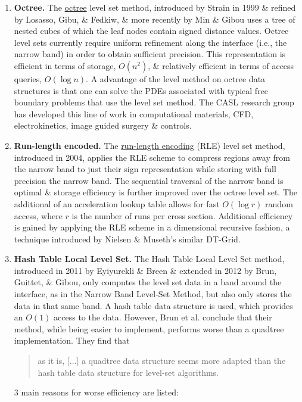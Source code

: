 \documentclass{article}
\begin{document}
\begin{enumerate}
	\item {\bf Octree.} The \href{https://en.wikipedia.org/wiki/Octree}{octree} level set method, introduced by {\sc Strain} in 1999 \& refined by {\sc Losasso, Gibu, \& Fedkiw}, \& more recently by {\sc Min \& Gibou} uses a tree of nested cubes of which the leaf nodes contain signed distance values. Octree level sets currently require uniform refinement along the interface (i.e., the narrow band) in order to obtain sufficient precision. This representation is efficient in terms of storage, $O(n^2)$, \& relatively efficient in terms of access queries, $O(\log n)$. A advantage of the level method on octree data structures is that one can solve the PDEs associated with typical free boundary problems that use the level set method. The CASL research group has developed this line of work in computational materials, CFD, electrokinetics, image guided surgery \& controls.
	\item {\bf Run-length encoded.} The \href{https://en.wikipedia.org/wiki/Run-length_encoding}{run-length encoding} (RLE) level set method, introduced in 2004, applies the RLE scheme to compress regions away from the narrow band to just their sign representation while storing with full precision the narrow band. The sequential traversal of the narrow band is optimal \& storage efficiency is further improved over the octree level set. The additional of an acceleration lookup table allows for fast $O(\log r)$ random access, where $r$ is the number of runs per cross section. Additional efficiency is gained by applying the RLE scheme in a dimensional recursive fashion, a technique introduced by {\sc Nielsen \& Museth}'s similar DT-Grid.
	\item {\bf Hash Table Local Level Set.} The Hash Table Local Level Set method, introduced in 2011 by {\sc Eyiyurekli \& Breen} \& extended in 2012 by {\sc Brun, Guittet, \& Gibou}, only computes the level set data in a band around the interface, as in the Narrow Band Level-Set Method, but also only stores the data in that same band. A hash table data structure is used, which provides an $O(1)$ access to the data. However, {\sc Brun} et al. conclude that their method, while being easier to implement, performs worse than a quadtree implementation. They find that
	\begin{quote}
		as it is, [$\ldots$] a quadtree data structure seems more adapted than the hash table data structure for level-set algorithms.
	\end{quote}
	3 main reasons for worse efficiency are listed:
	\begin{enumerate}

\end{enumerate}
\end{enumerate}
\end{document}
